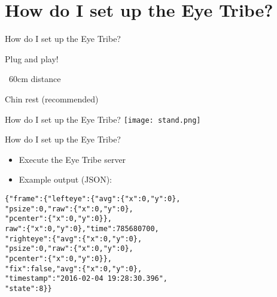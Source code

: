 \documentclass[unknownkeysallowed]{beamer}
\newenvironment{itemize*}%
  {\begin{itemize}%
    \setlength{\itemsep}{15pt}%
    \setlength{\parskip}{0pt}}%
  {\end{itemize}}
\begin{document}
\section{How do I set up the Eye Tribe?}
\begin{frame}{How do I set up the Eye Tribe?}
\begin{itemize*}
\item<1->{Plug and play!}
\item<2->{~60cm distance}
\item<3->{Chin rest (recommended)}
\end{itemize*}
\end{frame}
\begin{frame}{How do I set up the Eye Tribe?}
\centering
\texttt{[image: stand.png]}
\end{frame}
\begin{frame}[fragile]{How do I set up the Eye Tribe?}
\begin{itemize}
\item{Execute the Eye Tribe server}
\item{Example output (JSON):}
\end{itemize}
\begin{lstlisting}
{"frame":{"lefteye":{"avg":{"x":0,"y":0},
"psize":0,"raw":{"x":0,"y":0},
"pcenter":{"x":0,"y":0}},
raw":{"x":0,"y":0},"time":785680700,
"righteye":{"avg":{"x":0,"y":0},
"psize":0,"raw":{"x":0,"y":0},
"pcenter":{"x":0,"y":0}},
"fix":false,"avg":{"x":0,"y":0},
"timestamp":"2016-02-04 19:28:30.396",
"state":8}}
\end{lstlisting}
\end{frame}
\end{document}
